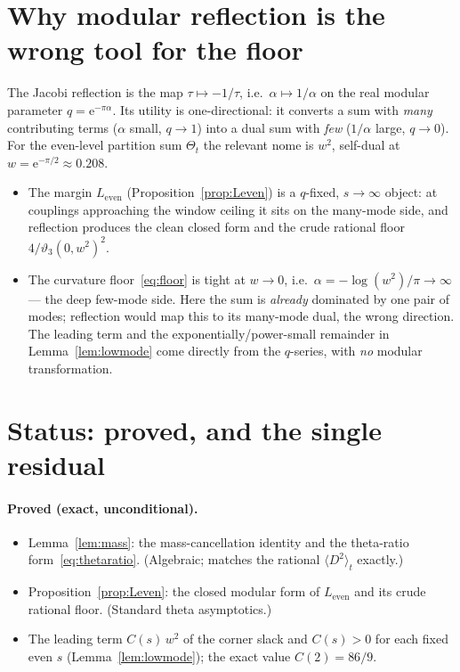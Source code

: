\documentclass[11pt]{article}
\theoremstyle{definition}
\newcommand{\e}{\mathrm{e}}
\newcommand{\Dsq}{\langle D^2\rangle}
\begin{document}
\section{Why modular reflection is the wrong tool for the floor}

The Jacobi reflection is the map $\tau\mapsto-1/\tau$, i.e.\
$\alpha\mapsto1/\alpha$ on the real modular parameter $q=\e^{-\pi\alpha}$. Its
utility is one-directional: it converts a sum with \emph{many} contributing
terms ($\alpha$ small, $q\to1$) into a dual sum with \emph{few} ($1/\alpha$
large, $q\to0$). For the even-level partition sum $\Theta_t$ the relevant nome
is $w^2$, self-dual at $w=\e^{-\pi/2}\approx0.208$.

\begin{itemize}
\item The margin $L_{\mathrm{even}}$ (Proposition~\ref{prop:Leven}) is a
$q$-fixed, $s\to\infty$ object: at couplings approaching the window ceiling it
sits on the many-mode side, and reflection produces the clean closed form and
the crude rational floor $4/\vartheta_3(0,w^2)^2$.
\item The curvature floor~\eqref{eq:floor} is tight at $w\to0$, i.e.\
$\alpha=-\log(w^2)/\pi\to\infty$ --- the deep few-mode side. Here the sum is
\emph{already} dominated by one pair of modes; reflection would map this to its
many-mode dual, the wrong direction. The leading term and the
exponentially/power-small remainder in Lemma~\ref{lem:lowmode} come directly
from the $q$-series, with \emph{no} modular transformation.
\end{itemize}

\section{Status: proved, and the single residual}

\paragraph{Proved (exact, unconditional).}
\begin{itemize}
\item Lemma~\ref{lem:mass}: the mass-cancellation identity and the theta-ratio
form~\eqref{eq:thetaratio}. (Algebraic; matches the rational $\Dsq_t$ exactly.)
\item Proposition~\ref{prop:Leven}: the closed modular form of
$L_{\mathrm{even}}$ and its crude rational floor. (Standard theta asymptotics.)
\item The leading term $C(s)\,w^2$ of the corner slack and $C(s)>0$ for each
fixed even $s$ (Lemma~\ref{lem:lowmode}); the exact value $C(2)=86/9$.
\end{itemize}
\end{document}
